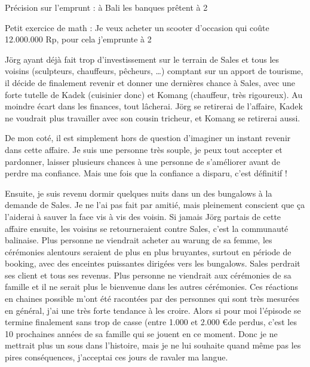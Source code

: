 \par
Précision sur l’emprunt : à Bali les banques prêtent à 2 %

\par
Petit exercice de math : Je veux acheter un scooter d’occasion qui coûte 12.000.000 Rp, pour cela j’emprunte à 2%

\par
Jörg ayant déjà fait trop d’investissement sur le terrain de Sales et tous les voisins (sculpteurs, chauffeurs, pêcheurs, …) comptant sur un apport de tourisme, il décide de finalement revenir et donner une dernières chance à Sales, avec une forte tutelle de Kadek (cuisinier donc) et Komang (chauffeur, très rigoureux). Au moindre écart dans les finances, tout lâcherai. Jörg se retirerai de l’affaire, Kadek ne voudrait plus travailler avec son cousin tricheur, et Komang se retirerai aussi.

\par
De mon coté, il est simplement hors de question d’imaginer un instant revenir dans cette affaire. Je suis une personne très souple, je peux tout accepter et pardonner, laisser plusieurs chances à une personne de s’améliorer avant de perdre ma confiance. Mais une fois que la confiance a disparu, c’est définitif !

\par
Ensuite, je suis revenu dormir quelques nuits dans un des bungalows à la demande de Sales. Je ne l’ai pas fait par amitié, mais pleinement conscient que ça l’aiderai à sauver la face vis à vis des voisin. Si jamais Jörg partais de cette affaire ensuite, les voisins se retourneraient contre Sales, c’est la communauté balinaise. Plus personne ne viendrait acheter au warung de sa femme, les cérémonies alentours seraient de plus en plus bruyantes, surtout en période de booking, avec des enceintes puissantes dirigées vers les bungalows. Sales perdrait ses client et tous ses revenus. Plus personne ne viendrait aux cérémonies de sa famille et il ne serait plus le bienvenue dans les autres cérémonies. Ces réactions en chaines possible m’ont été racontées par des personnes qui sont très mesurées en général, j’ai une très forte tendance à les croire. Alors si pour moi l’épisode se termine finalement sans trop de casse (entre 1.000 et 2.000 \euro de perdus, c’est les 10 prochaines années de sa famille qui se jouent en ce moment. Donc je ne mettrait plus un sous dans l’histoire, mais je ne lui souhaite quand même pas les pires conséquences, j’acceptai ces jours de ravaler ma langue.

